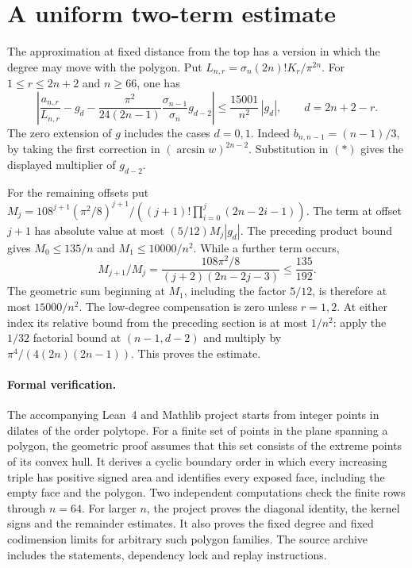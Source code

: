 \documentclass[11pt]{article}
\begin{document}
\section{A uniform two-term estimate}

The approximation at fixed distance from the top has a version in which the
degree may move with the polygon. Put \(L_{n,r}=\sigma_n(2n)!K_r/\pi^{2n}\).
For \(1\le r\le 2n+2\) and \(n\ge66\), one has
\[
 \left|\frac{a_{n,r}}{L_{n,r}}-g_d
 -\frac{\pi^2}{24(2n-1)}\frac{\sigma_{n-1}}{\sigma_n}g_{d-2}\right|
 \le \frac{15001}{n^2}\,|g_d|,\qquad d=2n+2-r .
\]
The zero extension of \(g\) includes the cases \(d=0,1\).
Indeed \(b_{n,n-1}=(n-1)/3\), by taking the first correction in
\((\arcsin w)^{2n-2}\). Substitution in \((*)\) gives the displayed
multiplier of \(g_{d-2}\).

For the remaining offsets put \(M_j=108^{j+1}(\pi^2/8)^{j+1}/
((j+1)!\prod_{i=0}^j(2n-2i-1))\). The term at offset \(j+1\) has
absolute value at most \((5/12)M_j|g_d|\). The preceding product bound
gives \(M_0\le135/n\) and \(M_1\le10000/n^2\). While a further term occurs,
\[
 M_{j+1}/M_j=\frac{108\pi^2/8}{(j+2)(2n-2j-3)}
 \le\frac{135}{192}.
\]
The geometric sum beginning at \(M_1\), including the factor \(5/12\),
is therefore at most \(15000/n^2\). The low-degree compensation is zero
unless \(r=1,2\). At either index its relative bound from the preceding
section is at most \(1/n^2\): apply the \(1/32\) factorial bound at
\((n-1,d-2)\) and multiply by
\(\pi^4/(4(2n)(2n-1))\). This proves the estimate.

\paragraph{Formal verification.}
The accompanying Lean~4 and Mathlib project starts from integer points
in dilates of the order polytope. For a finite set of points in the plane spanning a polygon,
the geometric proof assumes that this set consists of the extreme points
of its convex hull. It derives a cyclic boundary order in which every
increasing triple has positive signed area and identifies every exposed
face, including the empty face and the polygon. Two independent computations check the finite rows through
\(n=64\). For larger \(n\), the project proves the diagonal identity,
the kernel signs and the remainder estimates. It also proves the fixed
degree and fixed codimension limits for arbitrary such polygon families.
The source archive includes the statements, dependency lock and replay
instructions.
\end{document}
